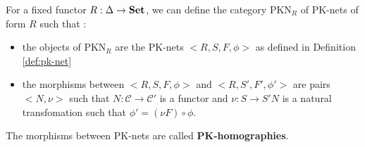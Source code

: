 \begin{defn}
    For a fixed functor $R: \Delta \rightarrow \bf Set$, we can define the category $ \text{PKN}_R$ of PK-nets of form $R$ such that : 
    \begin{itemize}
        \item the objects of $\text{PKN}_R$\label{nomencl:PKNR} are the PK-nets $\big<R,S,F,\phi\big>$ as defined in Definition \ref{def:pk-net}
        \item the morphisms between $\big<R,S,F,\phi\big>$ and $\big<R,S',F',\phi'\big>$ are pairs $\big< N,\nu\big>$ such that $N : \mathcal{C} \rightarrow \mathcal{C}'$ is a functor and $\nu : S \rightarrow S'N$ is a natural transfomation such that $\phi' = (\nu F)\circ \phi$.
    \end{itemize}
\end{defn}

\begin{note}
    The morphisms between PK-nets are called \textbf{PK-homographies}. 
\end{note}


